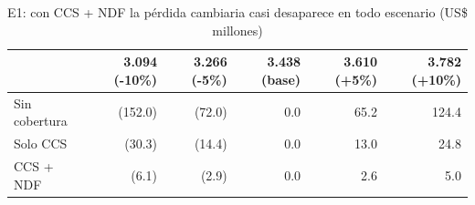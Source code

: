 \begin{table}[htbp]\centering\small
\caption{E1: con CCS + NDF la pérdida cambiaria casi desaparece en todo escenario (US\$ millones)}\label{tab:e1-escenarios}
\begin{tabular}{lrrrrr}
\toprule
 & \textbf{3.094 (-10\%)} & \textbf{3.266 (-5\%)} & \textbf{3.438 (base)} & \textbf{3.610 (+5\%)} & \textbf{3.782 (+10\%)} \\
\midrule
Sin cobertura & (152.0) & (72.0) & 0.0 & 65.2 & 124.4 \\
Solo CCS & (30.3) & (14.4) & 0.0 & 13.0 & 24.8 \\
CCS + NDF & (6.1) & (2.9) & 0.0 & 2.6 & 5.0 \\
\bottomrule
\end{tabular}
\end{table}
